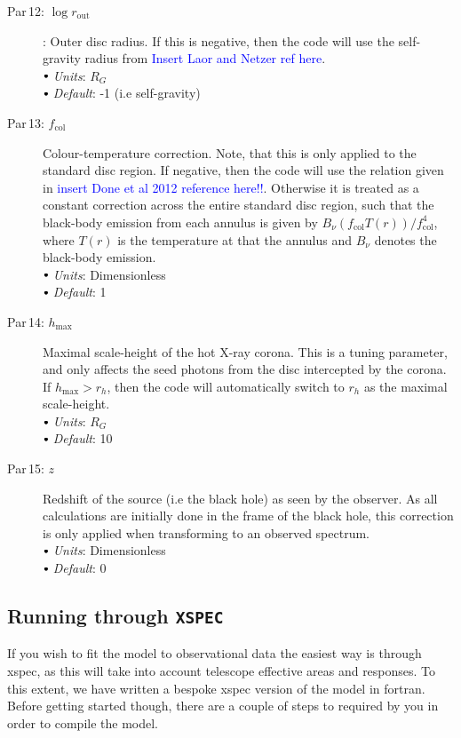 \documentclass[a4paper, 11pt, times, onecolumn]{article}
\newcommand{\rout}{r_{\mathrm{out}}}
\newcommand{\fcol}{f_{\mathrm{col}}}
\newcommand{\hmax}{h_{\mathrm{max}}}
\newcommand{\sbt}{\,\begin{picture}(-1,1)(-1,-3)\circle*{3}\end{picture}\ }
\begin{document}
\begin{description}
	\item[Par\,12:\,\,$\log \rout$]: Outer disc radius. If this is negative, then the code will use the self-gravity radius from \textcolor{blue}{Insert Laor and Netzer ref here}. \\
		$\sbt$ {\it Units}: $R_{G}$ \\
		$\sbt$ {\it Default}: -1 (i.e self-gravity)
	
	\item[Par\,13:\,\,$\fcol$] Colour-temperature correction. Note, that this is only applied to the standard disc region. If negative, then the code will use the relation given in \textcolor{blue}{insert Done et al 2012 reference here!!}. Otherwise it is treated as a constant correction across the entire standard disc region, such that the black-body emission from each annulus is given by $B_{\nu}(\fcol T(r))/\fcol^{4}$, where $T(r)$ is the temperature at that the annulus and $B_{\nu}$ denotes the black-body emission.\\
		$\sbt$ {\it Units}: Dimensionless \\
		$\sbt$ {\it Default}: 1 
	
	\item[Par\,14:\,\,$\hmax$] Maximal scale-height of the hot X-ray corona. This is a tuning parameter, and only affects the seed photons from the disc intercepted by the corona. If $\hmax > r_{h}$, then the code will automatically switch to $r_{h}$ as the maximal scale-height. \\
		$\sbt$ {\it Units}: $R_{G}$ \\
		$\sbt$ {\it Default}: 10
	
	\item[Par\,15:\,\,$z$] Redshift of the source (i.e the black hole) as seen by the observer. As all calculations are initially done in the frame of the black hole, this correction is only applied when transforming to an observed spectrum. \\
		$\sbt$ {\it Units}: Dimensionless \\
		$\sbt$ {\it Default}: 0
		
\end{description}




\subsection{Running through {\tt XSPEC}}

If you wish to fit the model to observational data the easiest way is through {\sc xspec}, as this will take into account telescope effective areas and responses. To this extent, we have written a bespoke {\sc xspec} version of the model in {\sc fortran}. Before getting started though, there are a couple of steps to required by you in order to compile the model.
\end{document}
